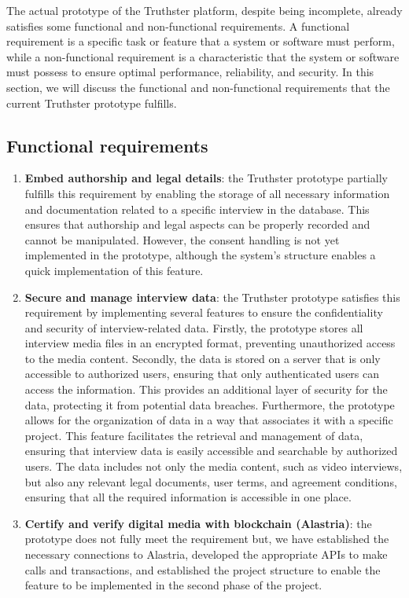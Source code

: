 \documentclass[target=mst,aauheader=]{thud}
\begin{document}
The actual prototype of the Truthster platform, despite being incomplete, already satisfies some functional and non-functional requirements. A functional requirement is a specific task or feature that a system or software must perform, while a non-functional requirement is a characteristic that the system or software must possess to ensure optimal performance, reliability, and security. In this section, we will discuss the functional and non-functional requirements that the current Truthster prototype fulfills.

\subsection{Functional requirements}

    \begin{enumerate}

        \item \textbf{Embed authorship and legal details}: the Truthster prototype partially fulfills this requirement by enabling the storage of all necessary information and documentation related to a specific interview in the database. This ensures that authorship and legal aspects can be properly recorded and cannot be manipulated. However, the consent handling is not yet implemented in the prototype, although the system's structure enables a quick implementation of this feature.
        \item \textbf{Secure and manage interview data}: the Truthster prototype satisfies this requirement by implementing several features to ensure the confidentiality and security of interview-related data. Firstly, the prototype stores all interview media files in an encrypted format, preventing unauthorized access to the media content. Secondly, the data is stored on a server that is only accessible to authorized users, ensuring that only authenticated users can access the information. This provides an additional layer of security for the data, protecting it from potential data breaches. Furthermore, the prototype allows for the organization of data in a way that associates it with a specific project. This feature facilitates the retrieval and management of data, ensuring that interview data is easily accessible and searchable by authorized users. The data includes not only the media content, such as video interviews, but also any relevant legal documents, user terms, and agreement conditions, ensuring that all the required information is accessible in one place.
        \item \textbf{Certify and verify digital media with blockchain (Alastria)}: the prototype does not fully meet the requirement but, we have established the necessary connections to Alastria, developed the appropriate APIs to make calls and transactions, and established the project structure to enable the feature to be implemented in the second phase of the project.
   
    \end{enumerate}
\end{document}

